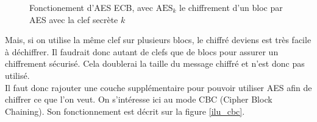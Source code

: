 \documentclass[a4paper, 12pt]{article}
\begin{document}
\begin{figure}[h]
\centering
{}
\caption{Fonctionement d'AES ECB, avec $\text{AES}_k$ le chiffrement d'un bloc par AES avec la clef secrète $k$}
\label{ilu_ECB}
\end{figure}

Mais, si on utilise la même clef sur plusieurs blocs, le chiffré deviens est très facile à déchiffrer. Il faudrait donc autant de clefs que de blocs pour assurer un chiffrement sécurisé. Cela doublerai la taille du message chiffré et n'est donc pas utilisé. \\

Il faut donc rajouter une couche supplémentaire pour pouvoir utiliser AES afin de chiffrer ce que l'on veut. On s'intéresse ici au mode CBC (Cipher Block Chaining). Son fonctionnement est décrit sur la figure \ref{ilu_cbc}.\\
\end{document}
